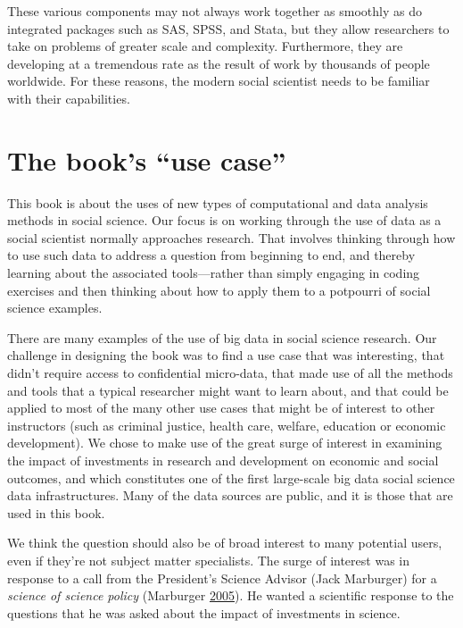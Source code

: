 \documentclass[]{krantz}
\begin{document}
These various components may not always work together as smoothly as do
integrated packages such as SAS, SPSS, and Stata, but they allow
researchers to take on problems of greater scale and complexity.
Furthermore, they are developing at a tremendous rate as the result of
work by thousands of people worldwide. For these reasons, the modern
social scientist needs to be familiar with their capabilities.

\section{\texorpdfstring{The book's ``use
case''}{The book's use case}}\label{sec:1-6}

This book is about the uses of new types of computational and data
analysis methods in social science. Our focus is on working through the
use of data as a social scientist normally approaches research. That
involves thinking through how to use such data to address a question
from beginning to end, and thereby learning about the associated
tools---rather than simply engaging in coding exercises and then
thinking about how to apply them to a potpourri of social science
examples.

There are many examples of the use of big data in social science
research. Our challenge in designing the book was to find a use case
that was interesting, that didn't require access to confidential
micro-data, that made use of all the methods and tools that a typical
researcher might want to learn about, and that could be applied to most
of the many other use cases that might be of interest to other
instructors (such as criminal justice, health care, welfare, education
or economic development). We chose to make use of the great surge of
interest in examining the impact of investments in research and
development on economic and social outcomes, and which constitutes one
of the first large-scale big data social science data infrastructures.
Many of the data sources are public, and it is those that are used in
this book.

We think the question should also be of broad interest to many potential
users, even if they're not subject matter specialists. The surge of
interest was in response to a call from the President's Science Advisor
(Jack Marburger) for a \emph{science of science policy} (Marburger
\protect\hyperlink{ref-marburger2005wanted}{2005}). He wanted a
scientific response to the questions that he was asked about the impact
of investments in science.
\end{document}
